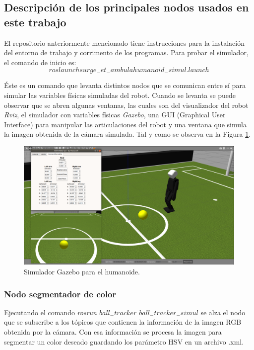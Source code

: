 		\subsection*{Descripción de los principales nodos usados en este trabajo}
		El repositorio anteriormente mencionado tiene instrucciones para la instalación del entorno de trabajo y corrimento de los programas. Para probar el simulador, el comando de inicio es: $$roslaunch surge_-et_-ambula humanoid_-simul.launch$$ 

		Éste es un comando que levanta distintos nodos que se comunican entre sí para simular las variables físicas simuladas del robot. Cuando se levanta se puede observar que se abren algunas ventanas, las cuales son del visualizador del robot \textit{Rviz}, el simulador con variables físicas \textit{Gazebo}, una GUI (Graphical User Interface) para manipular las articulaciones del robot y una ventana que simula la imagen obtenida de la cámara simulada. Tal y como se observa en la Figura \ref{fig:gazebo}.
		
\begin{figure}
	\centering
	\includegraphics[scale=0.2]{images/gazebo.png}
	\caption{Simulador Gazebo para el humanoide.}
	\label{fig:gazebo}
\end{figure} 
		
			\subsubsection*{Nodo segmentador de color}
			Ejecutando el comando \textit{rosrun $ball_-tracker$ $ball_-tracker_-simul$} se alza el nodo que se subscribe a los tópicos que contienen la información de la imagen RGB obtenida por la cámara. Con esa información se procesa la imagen para segmentar un color deseado guardando los parámetro HSV en un archivo .xml.
			
